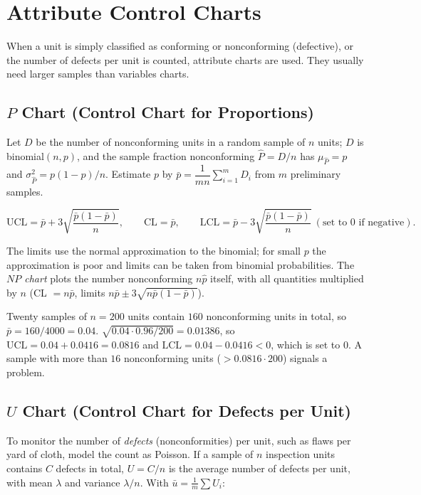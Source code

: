 \section{Attribute Control Charts}

When a unit is simply classified as conforming or nonconforming (defective), or the number of defects per unit is counted, attribute charts are used. They usually need larger samples than variables charts.

\subsection{$P$ Chart (Control Chart for Proportions)}

Let $D$ be the number of nonconforming units in a random sample of $n$ units; $D$ is binomial$(n,p)$, and the sample fraction nonconforming $\hat{P}=D/n$ has $\mu_{\hat{P}}=p$ and $\sigma^2_{\hat{P}}=p(1-p)/n$. Estimate $p$ by $\bar{p}=\dfrac1{mn}\sum_{i=1}^mD_i$ from $m$ preliminary samples.

\begin{theorem}[$P$ chart]\label{thm:pchart}
\[ \mathrm{UCL}=\bar{p}+3\sqrt{\frac{\bar{p}(1-\bar{p})}n},\qquad\mathrm{CL}=\bar{p},\qquad\mathrm{LCL}=\bar{p}-3\sqrt{\frac{\bar{p}(1-\bar{p})}n}\ (\text{set to }0\text{ if negative}). \]
\end{theorem}

The limits use the normal approximation to the binomial; for small $p$ the approximation is poor and limits can be taken from binomial probabilities. The \emph{$NP$ chart} plots the number nonconforming $n\hat{p}$ itself, with all quantities multiplied by $n$ (CL $=n\bar{p}$, limits $n\bar{p}\pm3\sqrt{n\bar{p}(1-\bar{p})}$).

\begin{example}
Twenty samples of $n=200$ units contain $160$ nonconforming units in total, so $\bar{p}=160/4000=0.04$. $\sqrt{0.04\cdot0.96/200}=0.01386$, so $\mathrm{UCL}=0.04+0.0416=0.0816$ and $\mathrm{LCL}=0.04-0.0416<0$, which is set to $0$. A sample with more than $16$ nonconforming units ($>0.0816\cdot200$) signals a problem.
\end{example}

\subsection{$U$ Chart (Control Chart for Defects per Unit)}

To monitor the number of \emph{defects} (nonconformities) per unit, such as flaws per yard of cloth, model the count as Poisson. If a sample of $n$ inspection units contains $C$ defects in total, $U=C/n$ is the average number of defects per unit, with mean $\lambda$ and variance $\lambda/n$. With $\bar{u}=\frac1m\sum U_i$:

